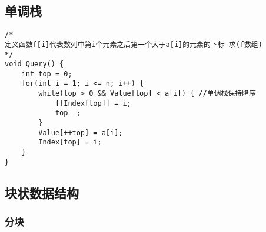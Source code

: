 \subsection{单调栈}
\begin{lstlisting}
/* 
定义函数f[i]代表数列中第i个元素之后第一个大于a[i]的元素的下标 求(f数组)
*/
void Query() {
	int top = 0;
	for(int i = 1; i <= n; i++) {
		while(top > 0 && Value[top] < a[i]) { //单调栈保持降序
			f[Index[top]] = i;
			top--;
		}
		Value[++top] = a[i];
		Index[top] = i;
	}
}
\end{lstlisting}


\subsection{块状数据结构}

\subsubsection{分块}
